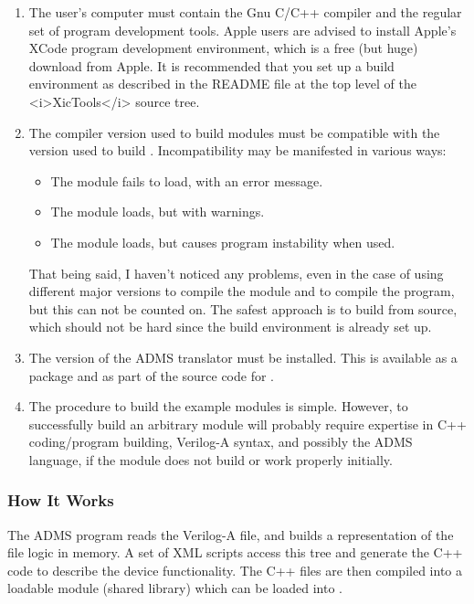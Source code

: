 \begin{enumerate}
\item {The user's computer must contain the Gnu C/C++ compiler and the
regular set of program development tools.  Apple users are advised to
install Apple's XCode program development environment, which is a free
(but huge) download from Apple.  It is recommended that you set up a
build environment as described in the {\vt README} file at the top
level of the <i>XicTools</i> source tree.}

\item {The compiler version used to build modules must be compatible with
the version used to build {\WRspice}.  Incompatibility may be
manifested in various ways:
\begin{itemize}
\item {The module fails to load, with an error message.}
\item {The module loads, but with warnings.}
\item {The module loads, but causes program instability when used.}
\end{itemize}

That being said, I haven't noticed any problems, even in the case of
using different major versions to compile the module and to compile
the program, but this can not be counted on.  The safest approach is
to build {\WRspice} from source, which should not be hard since the
build environment is already set up.}

\item {The {\XicTools} version of the ADMS translator must be
installed.  This is available as a package and as part of the
source code for {\XicTools}.}

\item {The procedure to build the example modules is simple.  However,
to successfully build an arbitrary module will probably require
expertise in C++ coding/program building, Verilog-A syntax, and
possibly the ADMS language, if the module does not build or work
properly initially.}
\end{enumerate}

\subsubsection{How It Works}

The ADMS program reads the Verilog-A file, and builds a representation
of the file logic in memory.  A set of XML scripts access this tree
and generate the C++ code to describe the device functionality.  The
C++ files are then compiled into a loadable module (shared library)
which can be loaded into {\WRspice}.

